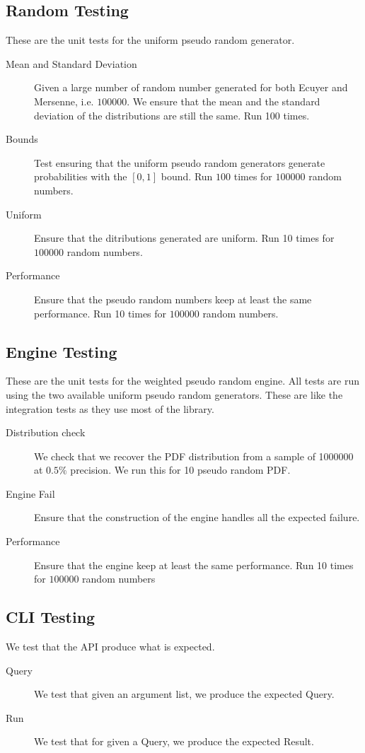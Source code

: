 \documentclass[12pt,a4paper,article]{memoir} %
\begin{document}
\subsection{Random Testing} 

These are the unit tests for the uniform pseudo random generator.
	
\begin{description}
	\item [Mean and Standard Deviation]
		Given a large number of random number generated for
		both Ecuyer and Mersenne, i.e. $100000$.
		We ensure that the mean and the standard deviation 
		of the distributions are still the same. Run 100 times.
	\item [Bounds]
		Test ensuring that the uniform pseudo random generators
		generate probabilities with the $[0, 1]$ bound.
		Run $100$ times for $100000$ random numbers.
	\item [Uniform]
		Ensure that the ditributions generated are uniform.
		Run 10 times for $100000$ random numbers.
	\item [Performance]
		Ensure that the pseudo random numbers keep at
		least the same performance.
		Run 10 times for $100000$ random numbers.
\end{description}

\subsection{Engine Testing} 
These are the unit tests for the weighted pseudo random engine.
All tests are run using the two available uniform pseudo random
generators. 
These are like the integration tests as they use most of the library.
\begin{description}
	\item [Distribution check]
		We check that we recover the PDF distribution from
		a sample of 1000000 at $0.5\%$ precision.
		We run this for 10 pseudo random PDF.
	\item [Engine Fail]
		Ensure that the construction of the engine 
		handles all the expected failure.
	\item [Performance]
		Ensure that the engine keep at least the same performance.
		Run 10 times for $100000$ random  numbers	
\end{description}	

\subsection{CLI Testing}
We test that the API produce what is expected.
\begin{description}
	\item [Query]
	We test that given an argument list, we produce the expected
	Query.
	\item[Run]
	We test that for given a Query, we produce the expected Result.
\end{description}
\end{document}
